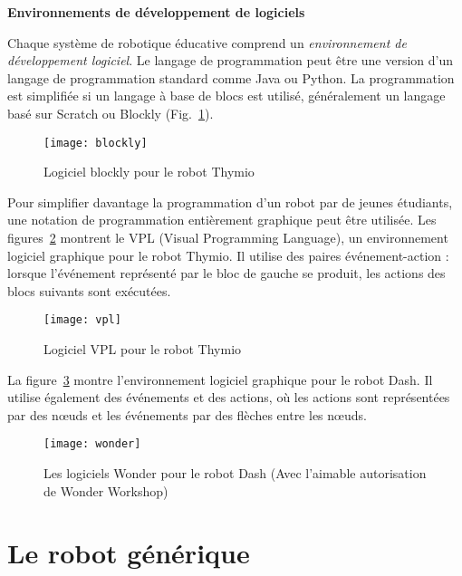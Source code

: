 \noindent\textbf{Environnements de développement de logiciels}

Chaque système de robotique éducative comprend un \emph{environnement de développement logiciel}. Le langage de programmation peut être une version d'un langage de programmation standard comme Java ou Python. La programmation est simplifiée si un langage à base de blocs est utilisé, généralement un langage basé sur Scratch ou Blockly (Fig.~\ref{fig.ide-blocks}).

\begin{figure}
\begin{center}
\texttt{[image: blockly]}
\end{center}
\caption{Logiciel blockly pour le robot Thymio}\label{fig.ide-blocks}
\end{figure}

Pour simplifier davantage la programmation d'un robot par de jeunes étudiants, une notation de programmation entièrement graphique peut être utilisée. Les figures~\ref{fig.ide-thymio} montrent le VPL (Visual Programming Language), un environnement logiciel graphique pour le robot Thymio. Il utilise des paires événement-action : lorsque l'événement représenté par le bloc de gauche se produit, les actions des blocs suivants sont exécutées.

\begin{figure}
\begin{center}
\texttt{[image: vpl]}
\end{center}
\caption{Logiciel VPL pour le robot Thymio}\label{fig.ide-thymio}
\end{figure}

La figure~\ref{fig.ide-dash} montre l'environnement logiciel graphique pour le robot Dash. Il utilise également des événements et des actions, où les actions sont représentées par des nœuds et les événements par des flèches entre les nœuds.

\begin{figure}
\begin{center}
\texttt{[image: wonder]}
\end{center}
\caption{Les logiciels Wonder pour le robot Dash (Avec l'aimable autorisation de Wonder Workshop)}\label{fig.ide-dash}
\end{figure}

\section{Le robot générique}\label{s.generic}

